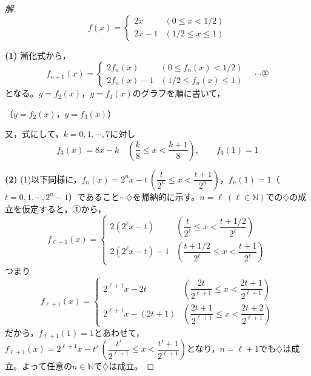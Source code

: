 \documentclass[../main.tex]{subfiles}
\begin{document}
\begin{proof}[解]
  \[
    f(x)=
    \begin{cases}
      2x & (0\le x<1/2) \\
      2x-1 & (1/2\le x\le1)
    \end{cases}
  \]

  \textbf{(1)} 漸化式から，
  \[
    f_{n+1}(x)=
    \begin{cases}
      2f_n(x) & (0\le f_n(x)<1/2) \\
      2f_n(x)-1 & (1/2\le f_n(x)\le1)
    \end{cases}
    \quad\cdots\text{①}
  \]
  となる。$y=f_2(x)$，$y=f_3(x)$のグラフを順に書いて，

  \begin{center}
    \quad
  \end{center}
  （$y=f_2(x)$，$y=f_3(x)$）

  又，式にして，$k=0,1,\cdots,7$に対し
  \[
    f_3(x)=8x-k \quad\left(\frac{k}{8}\le x<\frac{k+1}{8}\right), \qquad f_3(1)=1
  \]

  \textbf{(2)} (1)以下同様に，$f_n(x)=2^nx-t\ \left(\dfrac{t}{2^n}\le x<\dfrac{t+1}{2^n}\right)$，$f_n(1)=1$（$t=0,1,\cdots,2^n-1$）であること$\cdots\diamondsuit$を帰納的に示す。$n=\ell\ (\ell\in\mathbb{N})$での$\diamondsuit$の成立を仮定すると，①から，
  \[
    f_{\ell+1}(x)=
    \begin{cases}
      2(2^\ell x-t) & \left(\dfrac{t}{2^\ell}\le x<\dfrac{t+1/2}{2^\ell}\right) \\
      2(2^\ell x-t)-1 & \left(\dfrac{t+1/2}{2^\ell}\le x<\dfrac{t+1}{2^\ell}\right)
    \end{cases}
  \]
  つまり
  \[
    f_{\ell+1}(x)=
    \begin{cases}
      2^{\ell+1}x-2t & \left(\dfrac{2t}{2^{\ell+1}}\le x<\dfrac{2t+1}{2^{\ell+1}}\right) \\
      2^{\ell+1}x-(2t+1) & \left(\dfrac{2t+1}{2^{\ell+1}}\le x<\dfrac{2t+2}{2^{\ell+1}}\right)
    \end{cases}
  \]
  だから，$f_{\ell+1}(1)=1$とあわせて，$f_{\ell+1}(x)=2^{\ell+1}x-t'\ \left(\dfrac{t'}{2^{\ell+1}}\le x<\dfrac{t'+1}{2^{\ell+1}}\right)$となり，$n=\ell+1$でも$\diamondsuit$は成立。よって任意の$n\in\mathbb{N}$で$\diamondsuit$は成立。


\end{proof}
\end{document}
